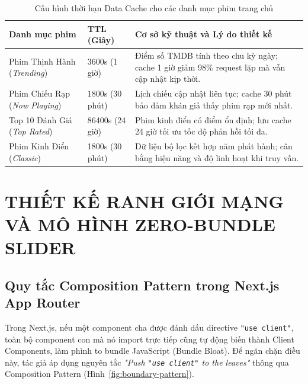 \documentclass[12pt,a4paper]{extarticle}
\begin{document}
\begin{table}[H]
\centering
\caption{Cấu hình thời hạn Data Cache cho các danh mục phim trang chủ}
\label{tab:cache-config}
\fontsize{9.5}{12.5}\selectfont
\renewcommand{\arraystretch}{1.2}
\begin{tabularx}{\textwidth}{|p{3.2cm}|p{2.2cm}|X|}
\hline
\textbf{Danh mục phim} & \textbf{TTL (Giây)} & \textbf{Cơ sở kỹ thuật và Lý do thiết kế} \\
\hline
Phim Thịnh Hành (\textit{Trending}) & 3600s (1 giờ) & Điểm số TMDB tính theo chu kỳ ngày; cache 1 giờ giảm 98\% request lặp mà vẫn cập nhật kịp thời. \\
\hline
Phim Chiếu Rạp (\textit{Now Playing}) & 1800s (30 phút) & Lịch chiếu cập nhật liên tục; cache 30 phút bảo đảm khán giả thấy phim rạp mới nhất. \\
\hline
Top 10 Đánh Giá (\textit{Top Rated}) & 86400s (24 giờ) & Phim kinh điển có điểm ổn định; lưu cache 24 giờ tối ưu tốc độ phản hồi tối đa. \\
\hline
Phim Kinh Điển (\textit{Classic}) & 1800s (30 phút) & Dữ liệu bộ lọc kết hợp năm phát hành; cân bằng hiệu năng và độ linh hoạt khi truy vấn. \\
\hline
\end{tabularx}
\end{table}

\section{THIẾT KẾ RANH GIỚI MẠNG VÀ MÔ HÌNH ZERO-BUNDLE SLIDER}

\subsection{Quy tắc Composition Pattern trong Next.js App Router}
Trong Next.js, nếu một component cha được đánh dấu directive \texttt{"use client"}, toàn bộ component con mà nó import trực tiếp cũng tự động biến thành Client Components, làm phình to bundle JavaScript (Bundle Bloat). Để ngăn chặn điều này, tác giả áp dụng nguyên tắc \textit{"Push \texttt{"use client"} to the leaves"} thông qua Composition Pattern (Hình~\ref{fig:boundary-pattern}).
\end{document}
